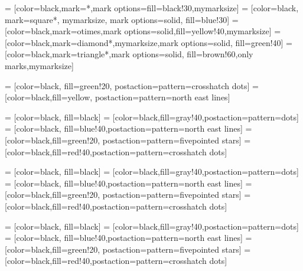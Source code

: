  = [color=black,mark=*,mark options={fill=black!30},mymarksize]
 = [color=black, mark=square*, mymarksize, mark options={solid, fill=blue!30}]
 = [color=black,mark=otimes,mark options={solid,fill=yellow!40},mymarksize]
 = [color=black,mark=diamond*,mymarksize,mark options={solid, fill=green!40}]
 = [color=black,mark=triangle*,mark options={solid, fill=brown!60,only marks},mymarksize]

 = [color=black, fill=green!20, postaction={pattern=crosshatch dots}]
 = [color=black,fill=yellow, postaction={pattern=north east lines}]

 = [color=black, fill=black]
 = [color=black,fill=gray!40,postaction={pattern=dots}]
 = [color=black, fill=blue!40,postaction={pattern=north east lines}]
 = [color=black,fill=green!20, postaction={pattern=fivepointed stars}]
 = [color=black,fill=red!40,postaction={pattern=crosshatch dots}]

 = [color=black, fill=black]
 = [color=black,fill=gray!40,postaction={pattern=dots}]
 = [color=black, fill=blue!40,postaction={pattern=north east lines}]
 = [color=black,fill=green!20, postaction={pattern=fivepointed stars}]
 = [color=black,fill=red!40,postaction={pattern=crosshatch dots}]

 = [color=black, fill=black]
 = [color=black,fill=gray!40,postaction={pattern=dots}]
 = [color=black, fill=blue!40,postaction={pattern=north east lines}]
 = [color=black,fill=green!20, postaction={pattern=fivepointed stars}]
 = [color=black,fill=red!40,postaction={pattern=crosshatch dots}]



